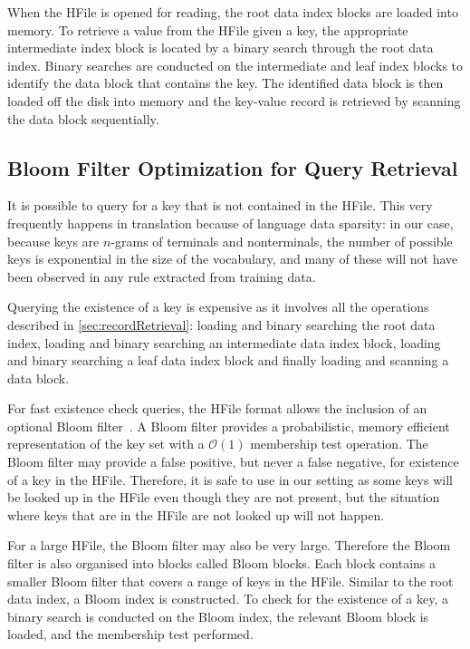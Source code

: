 When the HFile is opened for reading, the root data index blocks are loaded into memory.
To retrieve a value from the HFile given a key, the appropriate intermediate
index block is located by a binary search through the root data index. Binary
searches are conducted on the intermediate and leaf index blocks to identify the
data block that contains the key. The identified data block is then loaded off the disk
into memory and the key-value record is retrieved by scanning the data block
sequentially.

\subsection{Bloom Filter Optimization for Query Retrieval}
\label{sec:bloomFilterOptimization}

It is possible to query for a key that is not contained in the HFile. This very
frequently happens in translation because of language data sparsity: in our case,
because keys are $n$-grams of terminals and nonterminals, the number of possible
keys is exponential in the size of the vocabulary, and many of these
will not have been observed in any rule extracted from training data.

Querying
the existence of a key is expensive as it involves all the operations
described in \autoref{sec:recordRetrieval}: loading and binary
searching the root data index,
loading and binary searching an intermediate data index block,
loading and binary searching
a leaf data index block and finally loading and scanning a data block.

For fast existence check queries, the HFile format allows
the inclusion of an optional Bloom filter~\citep{bloom:1970:ACM}. A Bloom filter
provides a probabilistic, memory efficient representation of the key set with a
$\mathcal{O}(1)$ membership test operation. The Bloom filter may provide a false
positive, %
but never a false negative, for existence of a key in the HFile.
Therefore, it is safe to use in our setting as some keys will be looked
up in the HFile even though they are not present, but the situation
where keys that are in the HFile are not looked up will not happen.

For a large
HFile, the Bloom filter may also be very large. Therefore the  Bloom filter is
also organised into blocks called Bloom blocks. Each block contains a smaller
Bloom filter that covers a range of keys in the HFile. Similar to the root data
index, a Bloom index is constructed. To check for the
existence of a key, a binary search is conducted on the Bloom index, the
relevant Bloom block is loaded, and the membership test performed.


